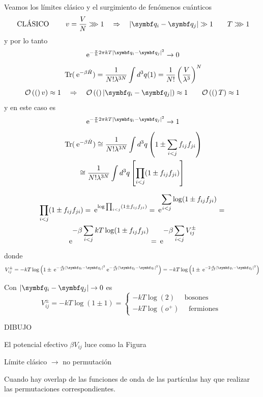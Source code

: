 \documentclass[10pt,oneside]{CBFT_book}
\begin{document}
Veamos los límites clásico y el surgimiento de fenómenos cuánticos 
\[
	\text{ CLÁSICO } \qquad v = \frac{V}{N} \ggg 1 \quad \Rightarrow \quad 
	|\vb{q}_i - \vb{q}_j| \gg 1 \qquad T \ggg 1
\]
y por lo tanto
\[
	\euler^{ -\frac{\pi}{h} 2\pi k T |\vb{q}_i - \vb{q}_j|^2} \to 0
\]
\[
	\text{ Tr} (\:\mathrm{e}^{-\beta\hat{H}}) = \frac{1}{N!\lambda^{3N}} \int d^{3}q (1) =
	\frac{1}{N!}\left( \frac{ V }{ \lambda^3 } \right)^N
\]
\[
	\Or(v) \approx 1 \quad \Rightarrow \quad \Or(|\vb{q}_i - \vb{q}_j|) \approx 1 \qquad
	\Or(T) \approx 1
\]
y en este caso es
\[
	\euler^{ -\frac{\pi}{h} 2\pi k T |\vb{q}_i - \vb{q}_j|^2} \to 1
\]
\begin{multline*}
	\text{ Tr} (\:\mathrm{e}^{-\beta\hat{H}}) \cong \frac{1}{N!\lambda^{3N}} \int d^{3}q 
	\left( 1 \pm \sum_{i<j} f_{ij} f_{ji}  \right) \\ 
	\cong \frac{1}{N!\lambda^{3N}} \int d^{3}q 
	\left[ \prod_{i<j} (1 \pm f_{ij} f_{ji} ) \right] 
\end{multline*}

\begin{multline*}
	\prod_{i<j} ( 1 \pm f_{ij}f_{ji}) = \displaystyle \:\mathrm{e}^{\log \prod_{i<j} ( 1 \pm f_{ij}f_{ji}) } =
	\:\mathrm{e}^{\displaystyle \sum_{i<j} \log ( 1 \pm f_{ij}f_{ji}) } = \\
	\:\mathrm{e}^{\displaystyle -\beta \sum_{i<j}  kT \log ( 1 \pm f_{ij}f_{ji}) } =
	\:\mathrm{e}^{\displaystyle -\beta \sum_{i<j}  V_{ij}^{\pm} }
\end{multline*}
donde 
\[
	V_{ij}^{\pm} = -kT\log \left( 1 \pm \euler^{-\frac{\pi}{\lambda^2}|\vb{q}_i - \vb{q}_j|^2} 
	\euler^{-\frac{\pi}{\lambda^2}|\vb{q}_j - \vb{q}_i|^2} \right) =
	-kT\log \left( 1 \pm  \euler^{-2\frac{\pi}{\lambda^2}|\vb{q}_i - \vb{q}_j|^2} \right)
\]

Con $ | \vb{q}_i - \vb{q}_j| \to 0 $ es
\[
	V_{ij}^{\pm} = -kT\log ( 1 \pm 1 ) = \begin{cases}
	                                           -kT\log (2) \quad \text{ bosones } \\
	                                           -kT\log (o^+) \quad \text{ fermiones } 
	                                          \end{cases}
\]

DIBUJO 

El potencial efectivo $\beta V_{ij}$ luce como la Figura


Límite clásico $\to$ no permutación 

Cuando hay overlap de las funciones de onda de las partículas hay que realizar las permutaciones correspondientes.
\end{document}
